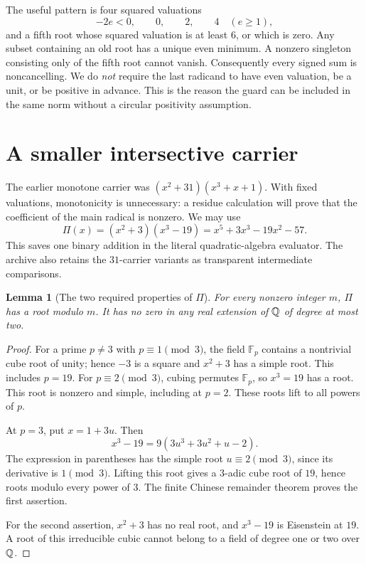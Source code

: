 \documentclass[11pt,letterpaper]{article}
\newtheorem{lemma}[theorem]{Lemma}
\theoremstyle{definition}\newtheorem{definition}[theorem]{Definition}
\theoremstyle{remark}\newtheorem{remark}[theorem]{Remark}
\begin{document}
The useful pattern is four squared valuations
\[
 -2e<0,\qquad 0,\qquad 2,\qquad 4
 \quad(e\geq1),
 \tag{5}\label{eq:valpattern}
\]
and a fifth root whose squared valuation is at least $6$, or which is zero. Any subset containing an old root has a unique even minimum. A nonzero singleton consisting only of the fifth root cannot vanish. Consequently every signed sum is noncancelling. We do \emph{not} require the last radicand to have even valuation, be a unit, or be positive in advance. This is the reason the guard can be included in the same norm without a circular positivity assumption.

\section{A smaller intersective carrier}
The earlier monotone carrier was $(x^2+31)(x^3+x+1)$. With fixed valuations, monotonicity is unnecessary: a residue calculation will prove that the coefficient of the main radical is nonzero. We may use
\[
 \Pi(x)=(x^2+3)(x^3-19)=x^5+3x^3-19x^2-57.
 \tag{6}\label{eq:pi}
\]
This saves one binary addition in the literal quadratic-algebra evaluator. The archive also retains the $31$-carrier variants as transparent intermediate comparisons.

\begin{lemma}[The two required properties of $\Pi$]\label{lem:pi}
For every nonzero integer $m$, $\Pi$ has a root modulo $m$. It has no zero in any real extension of $\mathbb Q$ of degree at most two.
\end{lemma}
\begin{proof}
For a prime $p\ne3$ with $p\equiv1\pmod3$, the field $\mathbb F_p$ contains a nontrivial cube root of unity; hence $-3$ is a square and $x^2+3$ has a simple root. This includes $p=19$. For $p\equiv2\pmod3$, cubing permutes $\mathbb F_p$, so $x^3=19$ has a root. This root is nonzero and simple, including at $p=2$. These roots lift to all powers of $p$.

At $p=3$, put $x=1+3u$. Then
\[
 x^3-19=9(3u^3+3u^2+u-2).
\]
The expression in parentheses has the simple root $u\equiv2\pmod3$, since its derivative is $1\pmod3$. Lifting this root gives a $3$-adic cube root of $19$, hence roots modulo every power of $3$. The finite Chinese remainder theorem proves the first assertion.

For the second assertion, $x^2+3$ has no real root, and $x^3-19$ is Eisenstein at $19$. A root of this irreducible cubic cannot belong to a field of degree one or two over $\mathbb Q$.
\end{proof}
\end{document}
